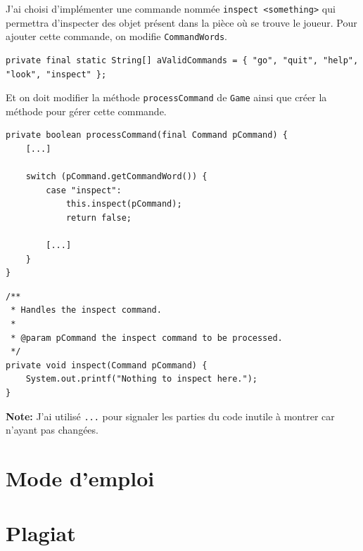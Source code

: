 \documentclass[a4paper,12pt]{report}
\begin{document}
\begin{exercise}[subtitle=Commande inspect]
 
 J'ai choisi d'implémenter une commande nommée \verb|inspect <something>| qui permettra d'inspecter des objet présent dans la pièce où se trouve le joueur. Pour ajouter cette commande, on modifie \verb|CommandWords|.
 
\begin{verbatim}
private final static String[] aValidCommands = { "go", "quit", "help", "look", "inspect" };
\end{verbatim}

Et on doit modifier la méthode \verb|processCommand| de \verb|Game| ainsi que créer la méthode pour gérer cette commande.

\begin{verbatim}
private boolean processCommand(final Command pCommand) {
    [...]

    switch (pCommand.getCommandWord()) {
        case "inspect":
            this.inspect(pCommand);
            return false;

        [...]
    }
}
\end{verbatim}

\begin{verbatim}
/**
 * Handles the inspect command.
 *
 * @param pCommand the inspect command to be processed.
 */
private void inspect(Command pCommand) {
    System.out.printf("Nothing to inspect here.");
}
\end{verbatim}

\textbf{Note:} J'ai utilisé \verb|...| pour signaler les parties du code inutile à montrer car n'ayant pas changées. 
\end{exercise}

\chapter{Mode d'emploi}

\chapter{Plagiat}
\end{document}

